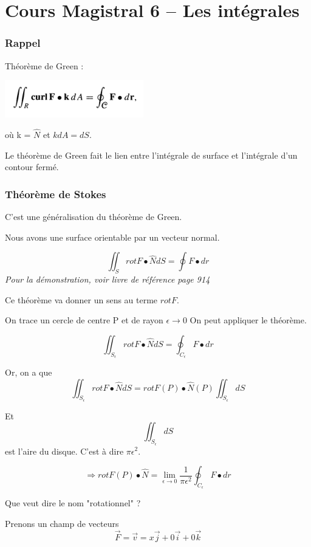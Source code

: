 \part{Cours Magistral 6 -- Les intégrales}
\section{Rappel}

Théorème de Green :

\begin{center}
\includegraphics[scale=0.7]{image1.png}\\
\end{center}

où k = $\hat N$ et $kdA = dS$.

Le théorème de Green fait le lien entre l'intégrale de surface et l'intégrale d'un contour fermé.


\section{Théorème de Stokes}

C'est une généralisation du théorème de Green.

Nous avons une surface orientable par un vecteur normal.

\[\iint_S rot F\bullet \hat N dS = \oint F\bullet dr\]
\textit{Pour la démonstration, voir livre de référence page 914}

Ce théorème va donner un sens au terme $rot F$.

On trace un cercle de centre P et de rayon $\epsilon \to 0$ On peut appliquer le théorème.

\[\iint_{S_{\epsilon}} rot F\bullet \hat N dS = \oint_{C_{\epsilon}} F\bullet dr\]

Or, on a que
\[\iint_{S_{\epsilon}} rot F\bullet \hat N dS = rot F (P) \bullet \hat N (P) \iint_{S_{\epsilon}} dS\]

Et \[\iint_{S_{\epsilon}} dS\] est l'aire du disque. C'est à dire $\pi \epsilon ^2$.

\[\Rightarrow rot F(P) \bullet \hat N = \lim_{\epsilon \to 0 }\frac{1}{\pi \epsilon ^2} \oint_{C_{\epsilon}}F\bullet dr\]

Que veut dire le nom "rotationnel" ?

Prenons un champ de vecteurs
\[\vec F = \vec v = x \vec j +0 \vec i +0 \vec k\]

